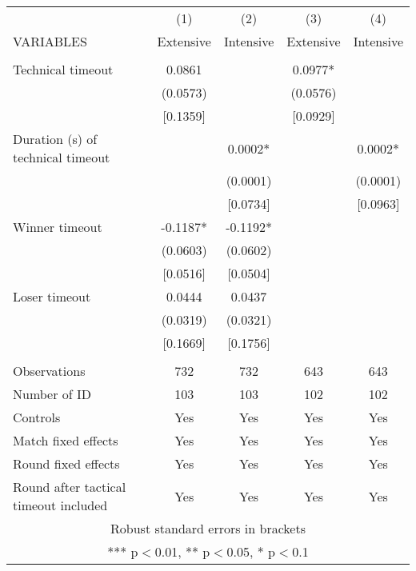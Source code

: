 \documentclass[]{article}
\begin{document}
\begin{tabular}{lcccc} \hline
 & (1) & (2) & (3) & (4) \\
VARIABLES & Extensive & Intensive & Extensive & Intensive \\ \hline
 &  &  &  &  \\
Technical timeout & 0.0861 &  & 0.0977* &  \\
 & (0.0573) &  & (0.0576) &  \\
 & [0.1359] &  & [0.0929] &  \\
Duration (s) of technical timeout &  & 0.0002* &  & 0.0002* \\
 &  & (0.0001) &  & (0.0001) \\
 &  & [0.0734] &  & [0.0963] \\
Winner timeout & -0.1187* & -0.1192* &  &  \\
 & (0.0603) & (0.0602) &  &  \\
 & [0.0516] & [0.0504] &  &  \\
Loser timeout & 0.0444 & 0.0437 &  &  \\
 & (0.0319) & (0.0321) &  &  \\
 & [0.1669] & [0.1756] &  &  \\
 &  &  &  &  \\
Observations & 732 & 732 & 643 & 643 \\
Number of ID & 103 & 103 & 102 & 102 \\
Controls & Yes & Yes & Yes & Yes \\
Match fixed effects & Yes & Yes & Yes & Yes \\
Round fixed effects & Yes & Yes & Yes & Yes \\
 Round after tactical timeout included & Yes & Yes & Yes & Yes \\ \hline
\multicolumn{5}{c}{ Robust standard errors in brackets} \\
\multicolumn{5}{c}{ *** p$<$0.01, ** p$<$0.05, * p$<$0.1} \\
\end{tabular}
\end{document}
